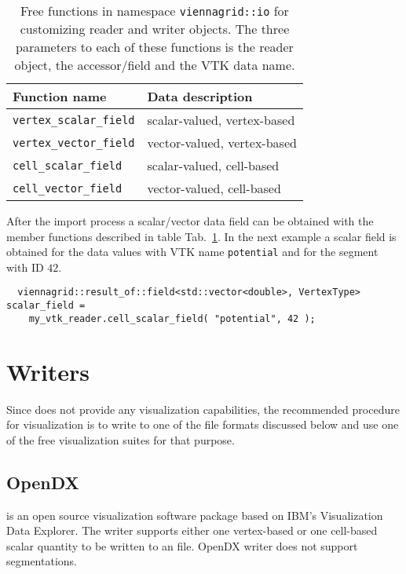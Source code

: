   
 
 \begin{table}[tb]
 \begin{center}
  \begin{tabular}{|l|l|}
   \hline
   Function name & Data description \\
   \hline
   \lstinline|vertex_scalar_field| & scalar-valued, vertex-based \\
   \lstinline|vertex_vector_field| & vector-valued, vertex-based \\
   \hline
   \lstinline|cell_scalar_field| & scalar-valued, cell-based \\
   \lstinline|cell_vector_field| & vector-valued, cell-based \\
   \hline
  \end{tabular}
 \end{center}
 \caption{Free functions in namespace \lstinline|viennagrid::io| for customizing reader and writer objects. The three parameters to each of these functions is the reader object, the accessor/field and the VTK data name.}
 \label{tab:io-field-obtaining}
 \end{table}
 
 After the import process a scalar/vector data field can be obtained with the member functions described in table Tab.~\ref{tab:io-field-obtaining}. In the next example a scalar field is obtained for the data values with VTK name \texttt{potential} and for the segment with ID $42$.
 
 \begin{lstlisting}
  viennagrid::result_of::field<std::vector<double>, VertexType> scalar_field =
    my_vtk_reader.cell_scalar_field( "potential", 42 );
 \end{lstlisting}
 
 
 
\section{Writers}
Since {\ViennaGrid} does not provide any visualization capabilities, the recommended procedure for visualization is 
to write to one of the file formats discussed below and use one of the free visualization suites for that purpose.


 \subsection{OpenDX}
 {\OpenDX} \cite{opendx} is an open source visualization software package based on IBM's Visualization Data Explorer.
 The writer supports either one vertex-based or one cell-based scalar quantity to be written to an {\OpenDX} file. OpenDX writer does not support segmentations.

